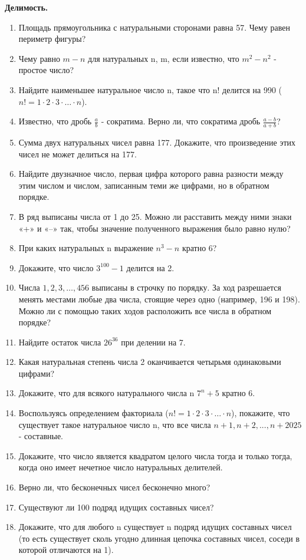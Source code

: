\documentclass[a4paper,12pt]{article}
\begin{document}
\begin{center}
    {\Large \textbf{Делимость.}}\\[0.5em]
\end{center}
    
\begin{enumerate}[label=\textbf{Задача \arabic*.}]
\item Площадь прямоугольника с натуральными сторонами равна 57. Чему равен периметр фигуры?
\item Чему равно $m - n$ для натуральных n, m, если известно, что $m^2 - n^2$ - простое число?
\item Найдите наименьшее натуральное число n, такое что
n! делится на 990 ($n! = 1 \cdot2\cdot3\cdot\ldots\cdot n$).
\item Известно, что дробь $\frac{a}{b}$ - сократима. Верно ли, что сократима дробь $\frac{a-b}{a+b}$?
\item Сумма двух натуральных чисел равна 177. Докажите, что произведение этих чисел не может делиться на 177.
\item Найдите двузначное число, первая цифра которого равна разности между этим числом и числом, записанным теми же цифрами, но в обратном порядке.
\item В ряд выписаны числа от 1 до 25. Можно ли расставить между ними знаки «+» и «–» так, чтобы
значение полученного выражения было равно нулю?
\item При каких натуральных n выражение $n^3 - n$ кратно 6?
\item Докажите, что число $3^{100} - 1$ делится на 2.
\item Числа $1, 2, 3, …, 456$ выписаны в строчку по порядку. За ход разрешается менять местами любые два числа, стоящие через одно (например, 196 и 198). Можно ли с помощью таких ходов расположить все числа в обратном порядке? 
\item Найдите остаток числа $26^{36}$ при делении на 7.
\item Какая натуральная степень числа 2 оканчивается четырьмя одинаковыми цифрами?
\item Докажите, что для всякого натурального числа n $7^n +5$ кратно 6.
\item Воспользуясь определением факториала ($n! = 1 \cdot2\cdot3\cdot\ldots\cdot n$), покажите, что существует такое натуральное число n, что все числа $n + 1, n + 2, . . . , n + 2025$ -  составные.
\item Докажите, что число является квадратом целого числа тогда и только тогда, когда оно имеет нечетное число натуральных делителей.
\item Верно ли, что бесконечных чисел бесконечно много?
\item Существуют ли 100 подряд идущих составных чисел?
\item Докажите, что для любого n существует n подряд идущих составных чисел (то есть существует сколь угодно длинная цепочка составных чисел, соседи в которой отличаются на 1).
\end{enumerate}
\end{document}
